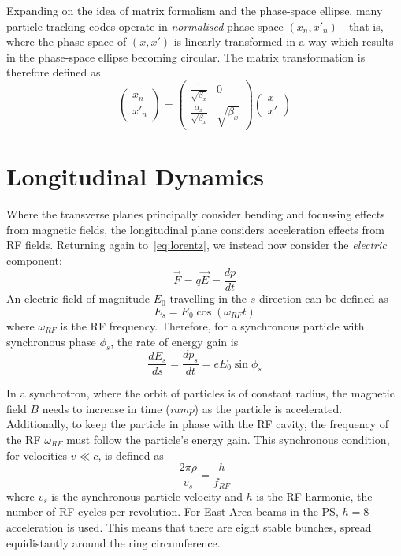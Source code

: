 \documentclass[a4paper,twoside,11pt]{report}
\begin{document}
Expanding on the idea of matrix formalism and the phase-space ellipse, many particle tracking codes operate in \textit{normalised} phase space $(x_n, x'_n)$---that is, where the phase space of $(x, x')$ is linearly transformed in a way which results in the phase-space ellipse becoming circular. The matrix transformation is therefore defined as
\begin{equation}
  \begin{pmatrix}
    x_n \\
    x'_n
  \end{pmatrix} = 
  \begin{pmatrix}
    \frac{1}{\sqrt{\beta_x}} & 0 \\
    \frac{\alpha_x}{\sqrt{\beta_x}} & \sqrt{\beta_x}
  \end{pmatrix} \begin{pmatrix}
    x \\
    x'
  \end{pmatrix}
  \label{eq:normalised}
\end{equation}

\section{Longitudinal Dynamics}\label{sec:long}

Where the transverse planes principally consider bending and focussing effects from magnetic fields, the longitudinal plane considers acceleration effects from RF fields. Returning again to~\autoref{eq:lorentz}, we instead now consider the \textit{electric} component:
\begin{equation}
  \vec F = q\vec E = \frac{dp}{dt}
\end{equation} 
An electric field of magnitude $E_0$ travelling in the $s$ direction can be defined as
\begin{equation}
  E_s = E_0\cos(\omega_{RF}t)
\end{equation} where $\omega_{RF}$ is the RF frequency. Therefore, for a synchronous particle with synchronous phase $\phi_s$, the rate of energy gain is
\begin{equation}
  \frac{dE_s}{ds}=\frac{dp_s}{dt}=eE_0\sin\phi_s
\end{equation}

In a synchrotron, where the orbit of particles is of constant radius, the magnetic field $B$ needs to increase in time (\textit{ramp}) as the particle is accelerated. Additionally, to keep the particle in phase with the RF cavity, the frequency of the RF $\omega_{RF}$ must follow the particle's energy gain. This synchronous condition, for velocities $v\ll c$, is defined as~\cite{Tecker:2674860}
\begin{equation}
  \frac{2\pi\rho}{v_s}=\frac h{f_{RF}}
\end{equation} where $v_s$ is the synchronous particle velocity and $h$ is the RF harmonic, the number of RF cycles per revolution. For East Area beams in the PS, $h=8$ acceleration is used. This means that there are eight stable bunches, spread equidistantly around the ring circumference. 
\end{document}
